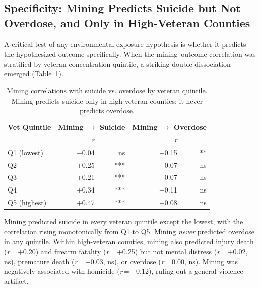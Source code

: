 \documentclass[11pt,twocolumn]{article}
\begin{document}
\subsection{Specificity: Mining Predicts Suicide but Not Overdose, and Only in High-Veteran Counties}

A critical test of any environmental exposure hypothesis is whether it predicts the hypothesized outcome specifically. When the mining--outcome correlation was stratified by veteran concentration quintile, a striking double dissociation emerged (Table~\ref{tab:specificity}).

\begin{table}[H]
\centering
\small
\caption{Mining correlations with suicide vs. overdose by veteran quintile. Mining predicts suicide only in high-veteran counties; it never predicts overdose.}
\label{tab:specificity}
\begin{tabular}{@{}lrrrr@{}}
\toprule
\textbf{Vet Quintile} & \multicolumn{2}{c}{\textbf{Mining $\rightarrow$ Suicide}} & \multicolumn{2}{c}{\textbf{Mining $\rightarrow$ Overdose}} \\
& \textit{r} & & \textit{r} & \\
\midrule
Q1 (lowest) & $-$0.04 & ns & $-$0.15 & ** \\
Q2 & +0.25 & *** & +0.07 & ns \\
Q3 & +0.21 & *** & $-$0.07 & ns \\
Q4 & +0.34 & *** & +0.11 & ns \\
Q5 (highest) & +0.47 & *** & $-$0.08 & ns \\
\bottomrule
\end{tabular}
\end{table}

Mining predicted suicide in every veteran quintile except the lowest, with the correlation rising monotonically from Q1 to Q5. Mining \textit{never} predicted overdose in any quintile. Within high-veteran counties, mining also predicted injury death (\textit{r}\,=\,+0.20) and firearm fatality (\textit{r}\,=\,+0.25) but not mental distress (\textit{r}\,=\,+0.02, ns), premature death (\textit{r}\,=\,$-$0.03, ns), or overdose (\textit{r}\,=\,0.00, ns). Mining was negatively associated with homicide (\textit{r}\,=\,$-$0.12), ruling out a general violence artifact.
\end{document}

